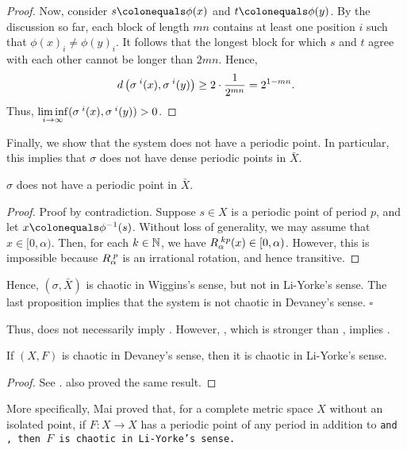 \documentclass[10pt,twoside,draft]{book}
\begin{document}
\begin{example}
\begin{proposition}
\begin{proof}
  Now, consider $s \ceq \phi(x)$ and $t \ceq \phi(y)$.
  By the discussion so far, each block of length $mn$ contains at least one position $i$ such that $\phi(x)_{i} \neq \phi(y)_{i}$.
  It follows that the longest block for which $s$ and $t$ agree with each other cannot be longer than $2mn$.
  Hence,
  \begin{equation*}
    d\left( \sigma^{\;i}(x), \sigma^{\;i}(y) \right) 
    \geq 2 \cdot \frac{1}{2^{mn}}
    = 2^{1 - mn}.
  \end{equation*}
  Thus, $\liminf\limits_{i \to \infty} (\sigma^{\;i}(x), \sigma^{\;i}(y)) > 0$.
\end{proof}
  \end{proposition}
  Finally, we show that the system does not have a periodic point.
  In particular, this implies that $\sigma$ does not have dense periodic points in $\bar{X}$.
  \begin{proposition}
    $\sigma$ does not have a periodic point in $\bar{X}$.
    \begin{proof}
      Proof by contradiction.
      Suppose $s \in X$ is a periodic point of period $p$, and let $x \ceq \phi^{-1}(s)$. 
      Without loss of generality, we may assume that $x \in [0, \alpha)$. %
      Then, for each $k \in \mathbb{N}$, we have $R_\alpha^{\;kp}(x) \in [0, \alpha)$. %
      However, this is impossible because $R_\alpha^{\;p}$ is an irrational rotation, and hence transitive.
    \end{proof}
  \end{proposition}
  Hence, $(\sigma, \bar{X})$ is chaotic in Wiggins's sense, but not in Li-Yorke's sense.
  The last proposition implies that the system is not chaotic in Devaney's sense.
  $\square$
  \label{eg:blanchard}
\end{example}
Thus, \wig does not necessarily imply \liy.
However, \dev, which is stronger than \wig, implies \liy.
\begin{theorem}
  If $(X, F)$ is chaotic in Devaney's sense, then it is chaotic in Li-Yorke's sense.
  \begin{proof}
    See \citet{mai}.
    \citet{huang} also proved the same result.
  \end{proof}
  \label{thm:dev-liy}
\end{theorem}
More specifically, Mai proved that, for a complete metric space $X$ without an isolated point, if $F: X \to X$ has a periodic point of any period in addition to \tt and \sdic, then $F$ is chaotic in Li-Yorke's sense.
\end{document}
